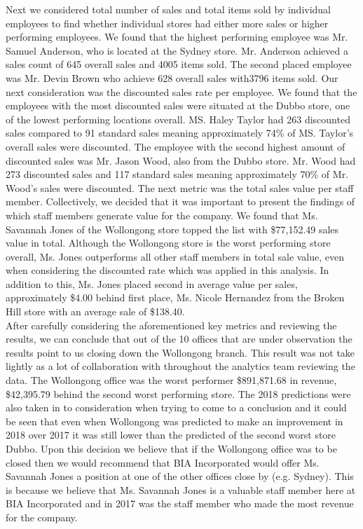 \documentclass{article}
\begin{document}
    Next we considered total number of sales and total items sold by individual employees 
    to find whether individual stores had either more sales or higher performing employees.  
    We found that the highest performing employee was Mr.  Samuel Anderson, who is located 
    at the Sydney store.  Mr.  Anderson achieved a sales count of 645 overall sales and 
    4005 items sold.  The second placed employee was Mr.  Devin Brown who achieve 628 overall sales with3796 items sold.  Our next consideration was the discounted sales rate per employee.  
    We found that the employees with the most discounted sales were situated at the 
    Dubbo store, one of the lowest performing locations overall. MS.   Haley  Taylor  
    had  263  discounted  sales  compared  to  91  standard  sales  meaning  approximately  
    74\%  of  MS. Taylor’s overall sales were discounted.  The employee with the second 
    highest amount of discounted sales was Mr. Jason Wood,  also from the Dubbo store.  
    Mr.  Wood had 273 discounted sales and 117 standard sales meaning approximately  
    70\%  of  Mr.   Wood’s  sales  were  discounted.   
    The  next  metric  was  the  total  sales  value  per  staff member.  
    Collectively, we decided that it was important to present the findings of which 
    staff members generate value for the company.  We found that Ms.  Savannah Jones 
    of the Wollongong store topped the list with \$77,152.49 sales value in total.  
    Although the Wollongong store is the worst performing store overall, Ms.  Jones 
    outperforms all other staff members in total sale value, even when considering 
    the discounted rate which was applied in this analysis.  In addition to this, Ms.  
    Jones placed second in average value per sales, approximately \$4.00 behind first 
    place, Ms.  Nicole Hernandez from the Broken Hill store with an average sale of \$138.40.\\

    After carefully considering the aforementioned key metrics and reviewing the results, 
    we can conclude that out of the 10 offices that are under observation the results 
    point to us closing down the Wollongong branch. This result was not take lightly as 
    a lot of collaboration with throughout the analytics team reviewing the data. The 
    Wollongong office was the worst performer \$891,871.68 in revenue, \$42,395.79 behind 
    the second worst performing  store. The 2018 predictions were also taken in to consideration 
    when trying to come to a conclusion and it could be seen that even when Wollongong was 
    predicted to make an improvement in 2018 over 2017 it was still lower than the predicted 
    of the second worst store Dubbo. Upon this decision we believe that if the Wollongong 
    office was to be closed then we would recommend that BIA Incorporated would offer Ms.  
    Savannah Jones a position at one of the other offices close by (e.g. Sydney). 
    This is because we believe that Ms.  Savannah Jones is a valuable staff member here at 
    BIA Incorporated  and in 2017 was the staff member who made the most revenue for the company.\\
\end{document}
